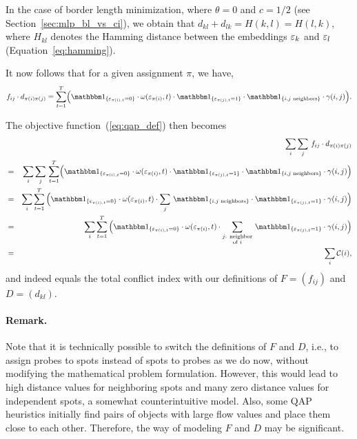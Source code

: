 In the case of border length minimization, where $\theta=0$ and $c=1/2$ (see
Section~\ref{sec:mlp_bl_vs_ci}), we obtain that
$d_{kl} + d_{lk} = H(k,l) = H(l,k)$, where $H_{kl}$ denotes the Hamming distance
between the embeddings $\varepsilon_k$ and $\varepsilon_l$ (Equation~\ref{eq:hamming}).

It now follows that for a given assignment $\pi$, we have,
\[
f_{ij} \cdot d_{\pi(i)\pi(j)} = \sum_{t=1}^{T} \Bigl(
  \Ind{\eps_{\pi(i),t}=0}
  \cdot \omega(\eps_{\pi(i)},t)
  \cdot \Ind{\eps_{\pi(j),t}=1}
  \cdot \Ind{i,j \text{ neighbors}}
  \cdot \gamma(i,j) \Bigr).
\]

The objective function~(\ref{eq:qap_def}) then becomes
\begin{eqnarray*}
 &   & \sum_i \sum_j\, f_{ij} \cdot d_{\pi(i)\pi(j)} \\
 & = & \sum_i \sum_j\, \sum_{t=1}^{T}
                       \Bigl(
                         \Ind{\eps_{\pi(i),t}=0}
                         \cdot \omega(\eps_{\pi(i)},t)
                         \cdot \Ind{\eps_{\pi(j),t}=1}
                         \cdot \Ind{i,j \text{ neighbors}}
                         \cdot \gamma(i,j)
                       \Bigr) \\
 & = & \sum_i \sum_{t=1}^T\,
              \Bigl(
                 \Ind{\eps_{\pi(i),t}=0}
                 \cdot \omega(\eps_{\pi(i)},t)
                 \cdot \sum_j\,
                 \Ind{i,j \text{ neighbors}}
                 \cdot \Ind{\eps_{\pi(j),t}=1}
                 \cdot \gamma(i,j)
              \Bigr) \\
 & = & \sum_i \sum_{t=1}^T\,
              \Bigl(
                 \Ind{\eps_{\pi(i),t}=0}
                 \cdot \omega(\eps_{\pi(i)},t)
                 \cdot \sum_{\substack{j \text{: neighbor}\\\text{of } i}}\,
                 \Ind{\eps_{\pi(j),t}=1}
                 \cdot \gamma(i,j)
              \Bigr) \\
 & = & \sum_i \mathcal{C}(i), \\
\end{eqnarray*}
and indeed equals the total conflict index with our definitions of $F=(f_{ij})$
and $D=(d_{kl})$.

\paragraph{Remark.}
Note that it is technically possible to switch the definitions of $F$ and $D$,
i.e., to assign probes to spots instead of spots to probes as we do now, without
modifying the mathematical problem formulation. However, this would lead to high
distance values for neighboring spots and many zero distance values for
independent spots, a somewhat counterintuitive model. Also, some QAP heuristics
initially find pairs of objects with large flow values and place them close to
each other. Therefore, the way of modeling $F$ and $D$ may be significant.


